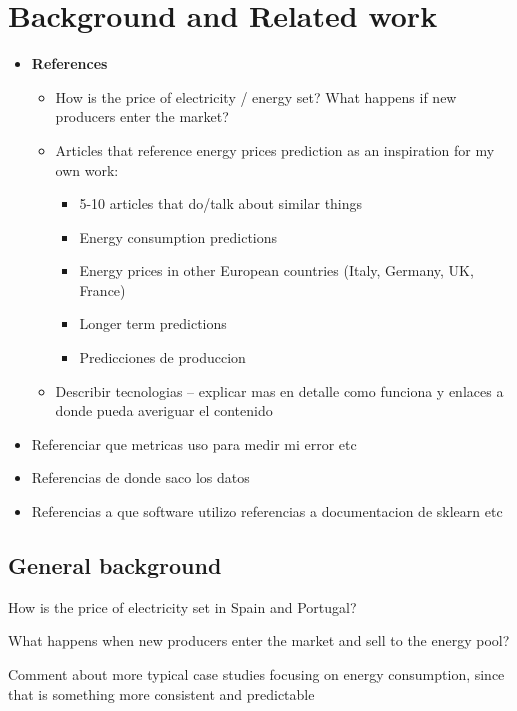 \documentclass[12pt]{report} %
\begin{document}
\chapter{Background and Related work}
\begin{itemize}
\item \textbf{References}
    \begin{itemize}
        \item How is the price of electricity / energy set? What happens if new producers enter the market?
        \item Articles that reference energy prices prediction as an inspiration for my own work:
        \begin{itemize}
            \item 5-10 articles that do/talk about similar things
            \item Energy consumption predictions
            \item Energy prices in other European countries (Italy, Germany, UK, France)
            \item Longer term predictions
            \item Predicciones de produccion
        \end{itemize}
        \item Describir tecnologias – explicar mas en detalle como funciona y enlaces a donde pueda averiguar el contenido
    \end{itemize}

    \item Referenciar que metricas uso para medir mi error etc
    \item Referencias de donde saco los datos

    \item Referencias a que software utilizo referencias a documentacion de sklearn etc
\end{itemize}

\section{General background}
How is the price of electricity set in Spain and Portugal?

What happens when new producers enter the market and sell to the energy pool?

Comment about more typical case studies focusing on energy consumption, since that is something more consistent and predictable

\end{document}

